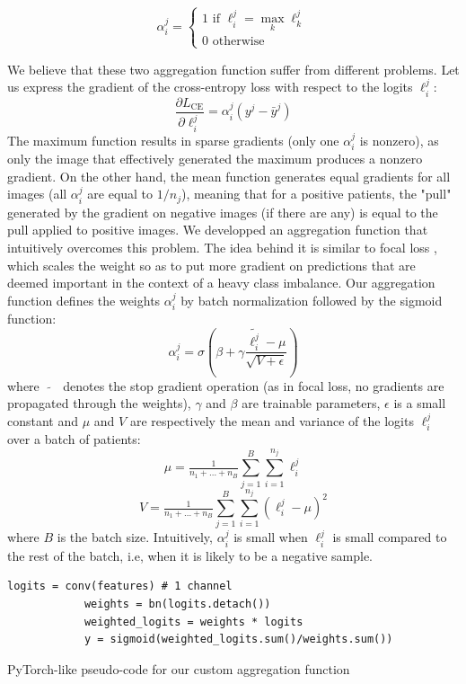 \documentclass[final]{cvpr}
\begin{document}
	$$
	\alpha_i^j  = \left\{
	\begin{array}{ll}
		1 \text{ if } \ell_i^j = \max_k \ell_k^j  \\
		0 \text{ otherwise}
	\end{array}
	\right.
	$$
	
	\vspace{1mm}
	\noindent
	We believe that these two aggregation function suffer from different problems. Let us express the gradient of the cross-entropy loss with respect to the logits $\ell_i^j$:
	$$\frac{\partial L_{\text{CE}}}{\partial \ell_i^j} = \alpha_i^j \left(y^j - \bar{y}^j\right)$$
	The maximum function results in sparse gradients (only one $\alpha_i^j$ is nonzero), as only the image that effectively generated the maximum produces a nonzero gradient. On the other hand, the mean function generates equal gradients for all images (all $\alpha_i^j$ are equal to $1/n_j$), meaning that for a positive patients, the "pull" generated by the gradient on negative images (if there are any) is equal to the pull applied to positive images. We developped an aggregation function that intuitively overcomes this problem.
	The idea behind it is similar to focal loss \cite{focal}, which scales the weight so as to put more gradient on predictions that are deemed important in the context of a heavy class imbalance.
	Our aggregation function defines the weights $\alpha_i^j$ by batch normalization \cite{bn} followed by the sigmoid function:
	$$ \alpha_i^j = \sigma\left(\beta + \gamma \frac{\widetilde{\ell_i^j} - \mu}{\sqrt{V+\epsilon}}\right) $$
	where $\; \widetilde{\text{ }} \;$ denotes the stop gradient operation (as in focal loss, no gradients are propagated through the weights), $\gamma$ and $\beta$ are trainable parameters, $\epsilon$ is a small constant and $\mu$ and $V$ are respectively the mean and variance of the logits $\ell_i^j$ over a batch of patients:
	$$\mu = \tfrac 1 {n_1+\dots+n_B} \sum_{j=1}^{B} \sum_{i=1}^{n_j} \ell_i^j$$
	$$V = \tfrac 1 {n_1+\dots+n_B} \sum_{j=1}^{B} \sum_{i=1}^{n_j} \left(\ell_i^j - \mu \right)^2$$
	where $B$ is the batch size. Intuitively, $\alpha_i^j$ is small when $\ell_i^j$ is small compared to the rest of the batch, i.e, when it is likely to be a negative sample.
	
	\begin{table}[h]
		\renewcommand\tablename{Pseudo-code}
		\begin{Verbatim}[fontsize=\footnotesize, samepage=true, frame=single]
			logits = conv(features) # 1 channel
			weights = bn(logits.detach())
			weighted_logits = weights * logits
			y = sigmoid(weighted_logits.sum()/weights.sum())
		\end{Verbatim}
		\caption{PyTorch-like pseudo-code for our custom aggregation function}
		\label{alg2}
	\end{table}
	
\end{document}
